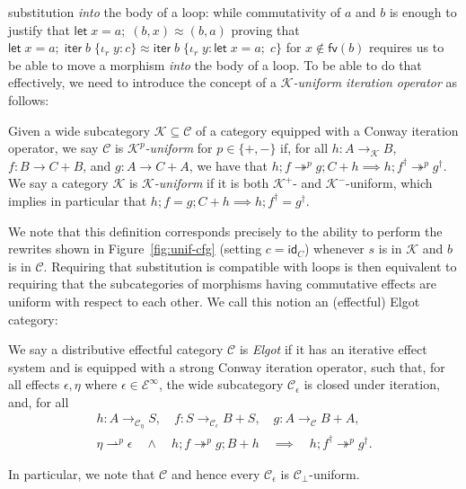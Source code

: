 \documentclass[acmsmall,screen,anonymous,review]{acmart}
\newcommand{\mc}[1]{\ensuremath{\mathcal{#1}}}
\newcommand{\ms}[1]{\ensuremath{\mathsf{#1}}}
\newcommand{\lto}{:}
\newcommand{\linr}[1]{\iota_r\;{#1}}
\newcommand{\letexpr}[3]{\ensuremath{\ms{let}\;#1 = #2;\;#3}}
\newcommand{\liter}[3]{\ms{iter}\;#1\;\{ \linr{#2} \lto #3 \}}
\newcommand{\cref}{\twoheadrightarrow}
\newcommand{\rightmove}{\rightharpoonup}
\begin{document}
substitution \emph{into} the body of a loop: while commutativity of $a$ and $b$ is enough to justify
that
$
\letexpr{x}{a}{(b, x)} \approx (b, a)
$
proving that
$
\letexpr{x}{a}{\liter{b}{y}{c}} \approx \liter{b}{y}{\letexpr{x}{a}{c}}
$
for $x \notin \ms{fv}(b)$ requires us to be able to move a morphism \emph{into} the body of a loop.
To be able to do that effectively, we need to introduce the concept of a \emph{\mc{K}-uniform
iteration operator} as follows:
\begin{definition}[Uniformity]
  Given a wide subcategory $\mc{K} \subseteq \mc{C}$ of a category equipped with a Conway iteration
  operator, we say $\mc{C}$ is \emph{$\mc{K}^p$-uniform} for $p \in \{+, -\}$ if, for all $h : A
  \to_{\mc{K}} B$, $f : B \to C + B$, and $g : A \to C + A$, we have that
  $
  h ; f \cref^p g ; C + h \implies h ; f^\dagger \cref^p g^\dagger 
  $.
  We say a category $\mc{K}$ is \emph{$\mc{K}$-uniform} if it is both $\mc{K}^+$- and
  $\mc{K}^-$-uniform, which implies in particular that
  $
  h ; f = g ; C + h \implies h ; f^\dagger = g^\dagger 
  $.
\end{definition}
We note that this definition corresponds precisely to the ability to perform the rewrites shown in
Figure~\ref{fig:unif-cfg} (setting $c = \ms{id}_C$) whenever $s$ is in $\mc{K}$ and $b$ is in
$\mc{C}$. Requiring that substitution is compatible with loops is then equivalent to requiring that
the subcategories of morphisms having commutative effects are uniform with respect to each other. We
call this notion an (effectful) Elgot category:
\begin{definition}
  We say a distributive effectful category $\mc{C}$ is \emph{Elgot} if it has an iterative effect
  system and is equipped with a strong Conway iteration operator, such that, for all effects
  $\epsilon, \eta$ where $\epsilon \in \mc{E}^\infty$, the wide subcategory $\mc{C}_\epsilon$ is
  closed under iteration, and, for all
  \[
    \begin{gathered}
    h : A \to_{\mc{C}_\eta} S,\quad
    f : S \to_{\mc{C}_\epsilon} B + S,\quad
    g : A \to_{\mc{C}} B + A,\\
    \eta \rightmove^p \epsilon \quad\land\quad
    h ; f \cref^p g ; B + h
    \quad\implies\quad h ; f^\dagger \cref^p g^\dagger.
    \end{gathered}
  \]

  In particular, we note that $\mc{C}$ and hence every $\mc{C}_\epsilon$ is
  $\mc{C}_\bot$-uniform.
\end{definition}
\end{document}
